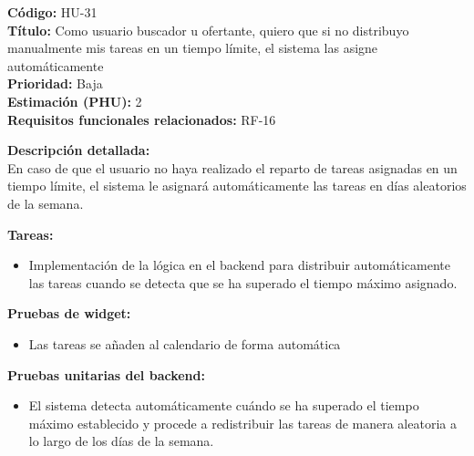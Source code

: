 \begin{tarjetaHU}
\textbf{Código:} HU-31 \\
\textbf{Título:} Como usuario buscador u ofertante, quiero que si no distribuyo manualmente mis tareas en un tiempo límite, el sistema las asigne automáticamente \\
\textbf{Prioridad:} Baja \\
\textbf{Estimación (PHU):} 2 \\
\textbf{Requisitos funcionales relacionados:} RF-16

\vspace{0.5em}
\textbf{Descripción detallada:} \\
En caso de que el usuario no haya realizado el reparto de tareas asignadas en un tiempo límite, el sistema le asignará automáticamente las tareas en días aleatorios de la semana.

\vspace{0.5em}
\textbf{Tareas:}
\begin{itemize}[left=0pt]
  \item Implementación de la lógica en el backend para distribuir automáticamente las tareas cuando se detecta que se ha superado el tiempo máximo asignado.
\end{itemize}

\vspace{0.5em}
\textbf{Pruebas de widget:}
\begin{itemize}[left=0pt]
  \item Las tareas se añaden al calendario de forma automática
\end{itemize}
\textbf{Pruebas unitarias del backend:}
\begin{itemize}[left=0pt]
  \item El sistema detecta automáticamente cuándo se ha superado el tiempo máximo establecido y procede a redistribuir las tareas de manera aleatoria a lo largo de los días de la semana.
\end{itemize}
\end{tarjetaHU}

